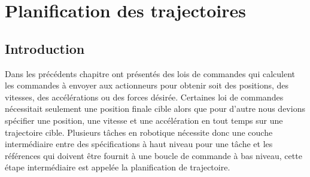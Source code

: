 \chapter{Planification des trajectoires}


\section{Introduction}

Dans les précédents chapitre ont présentés des lois de commandes qui calculent les commandes à envoyer aux actionneurs pour obtenir soit des positions, des vitesses, des accélérations ou des forces désirée. Certaines loi de commandes nécessitait seulement une position finale cible alors que pour d'autre nous devions spécifier une position, une vitesse et une accélération en tout temps sur une trajectoire cible. Plusieurs tâches en robotique nécessite donc une couche intermédiaire entre des spécifications à haut niveau pour une tâche et les références qui doivent être fournit à une boucle de commande à bas niveau, cette étape intermédiaire est appelée la planification de trajectoire.


